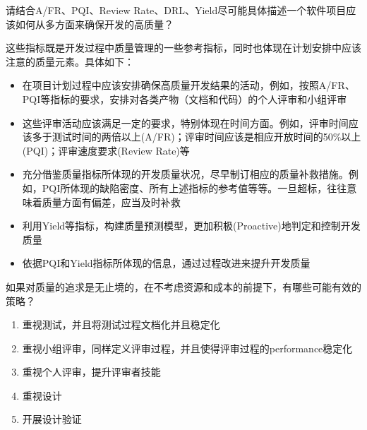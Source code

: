 \begin{problem}[2015A]
请结合A/FR、PQI、Review Rate、DRL、Yield尽可能具体描述一个软件项目应该如何从多方面来确保开发的高质量？
\end{problem}

\begin{solution}
这些指标既是开发过程中质量管理的一些参考指标，同时也体现在计划安排中应该注意的质量元素。具体如下：
\begin{itemize}
    \item 在项目计划过程中应该安排确保高质量开发结果的活动，例如，按照A/FR、PQI等指标的要求，安排对各类产物（文档和代码）的个人评审和小组评审
    \item 这些评审活动应该满足一定的要求，特别体现在时间方面。例如，评审时间应该多于测试时间的两倍以上(A/FR)；评审时间应该是相应开放时间的50\%以上(PQI)；评审速度要求(Review Rate)等
    \item 充分借鉴质量指标所体现的开发质量状况，尽早制订相应的质量补救措施。例如，PQI所体现的缺陷密度、所有上述指标的参考值等等。一旦超标，往往意味着质量方面有偏差，应当及时补救
    \item 利用Yield等指标，构建质量预测模型，更加积极(Proactive)地判定和控制开发质量
    \item 依据PQI和Yield指标所体现的信息，通过过程改进来提升开发质量
\end{itemize}
\end{solution}



\begin{problem}[2013、2015A]
如果对质量的追求是无止境的，在不考虑资源和成本的前提下，有哪些可能有效的策略？
\end{problem}

\begin{solution}
\vspace{-0.8em}
\begin{multicols}{2}
    \begin{enumerate}[label=\arabic*.]
        \item 重视测试，并且将测试过程文档化并且稳定化
        \item 重视小组评审，同样定义评审过程，并且使得评审过程的performance稳定化
        \item 重视个人评审，提升评审者技能
        \item 重视设计
        \item 开展设计验证
    \end{enumerate}
\end{multicols}
\vspace{-1em}
\end{solution}



